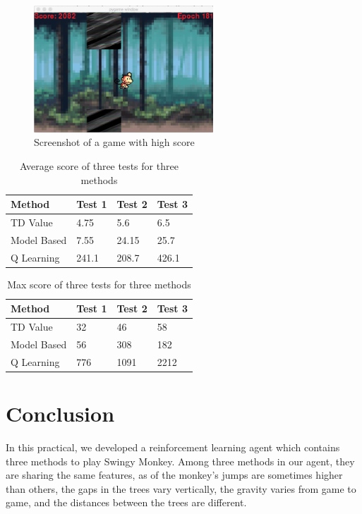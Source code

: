 \documentclass[submit]{harvardml}
\begin{document}
\begin{figure}[htbp]
\centering
\includegraphics[width=0.6\textwidth]{screenshot}
\caption{Screenshot of a game with high score}
\label{fig:screenshot}
\end{figure}

\begin{table}
\begin{center}
  \begin{tabular}{ | l | l | l | l  | }
    \hline
		Method & Test 1 & Test 2 & Test 3 \\ \hline
TD Value &		 4.75 &   5.6 &   6.5 \\ \hline   
Model Based &		7.55 &  24.15 &  25.7 \\ \hline		
Q Learning &   241.1 & 208.7 & 426.1 \\ \hline
  \end{tabular}
\end{center}
\caption{Average score of three tests for three methods}
\label{tab:mean}
\end{table}

\begin{table}
\begin{center}
  \begin{tabular}{ | l | l | l | l  | }
    \hline
    Method & Test 1 & Test 2 & Test 3 \\ \hline
TD Value &     32 &   46 &   58 \\ \hline   
Model Based &   56 &  308 &  182 \\ \hline   
Q Learning &   776 & 1091 & 2212 \\ \hline
  \end{tabular}
\end{center}
\caption{Max score of three tests for three methods}
\label{tab:max}
\end{table}

\section{Conclusion}
In this practical, we developed a reinforcement learning agent which contains three methods to play Swingy Monkey. Among three methods in our agent, they are sharing the same features, as of the monkey’s jumps are sometimes higher than others, the gaps in the trees vary vertically, the gravity varies from game to game, and the distances between the trees are different. 
\end{document}
